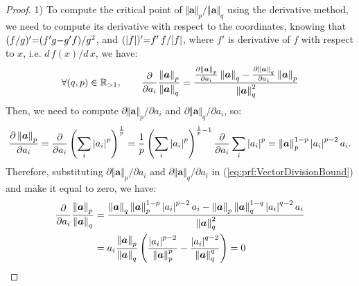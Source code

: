 \begin{proof}

1) To compute the critical point of $\Vert \boldsymbol{a} \Vert_{p} / \Vert \boldsymbol{a} \Vert_{q}$ using the derivative method, we need to compute its derivative with respect to the coordinates, knowing that $(f/g)' {=} (f'g {-} g'f)/g^2$, and $(|f|)' {=} f' \, f / |f| $, where $f'$ is derivative of $f$ with respect to $x$, i.e. $d \, f(x) / d \, x$, we have:
\begin{gather}
\label{eq:prf:VectorDivisionBound} 
\forall (q,p) \in \mathbb{R}_{> 1}, \qquad
\frac{\partial}{\partial a_i} \frac{\left\lVert\boldsymbol{a}\right\rVert_p}{\left\lVert\boldsymbol{a}\right\rVert_q} =
\frac{\frac{\partial \left\lVert\boldsymbol{a}\right\rVert_p}{\partial a_i} \left\lVert\boldsymbol{a}\right\rVert_q - \frac{\partial \left\lVert\boldsymbol{a}\right\rVert_q}{\partial a_i} \left\lVert\boldsymbol{a}\right\rVert_p}{\left\lVert\boldsymbol{a}\right\rVert_q^2}
\end{gather}
Then, we need to compute $\partial \Vert \boldsymbol{a} \Vert_p / \partial a_i$ and $\partial \Vert \boldsymbol{a} \Vert_q / \partial a_i$, so:
\begin{gather*}
\frac{\partial \left\lVert\boldsymbol{a}\right\rVert_p}{\partial a_i} =
\frac{\partial}{\partial a_i} \left( \sum_i \left\lvert a_i\right\rvert^p \right)^\frac{1}{p} = 
\frac{1}{p} \left( \sum_i \left\lvert a_i\right\rvert^p \right)^{\frac{1}{p} - 1} \frac{\partial}{\partial a_i} \sum_i \left\lvert a_i\right\rvert^p =
\left\lVert\boldsymbol{a}\right\rVert_{p} ^ {1 - p} \left\lvert a_i\right\rvert ^{p - 2} a_i.
\end{gather*}
Therefore, substituting $\partial \Vert \boldsymbol{a} \Vert_p / \partial a_i$ and $\partial \Vert \boldsymbol{a} \Vert_q / \partial a_i$ in (\ref{eq:prf:VectorDivisionBound}) and make it equal to zero, we have:
\begin{gather*}
\begin{aligned}
\frac{\partial}{\partial a_i} \frac{\mynorm{\boldsymbol{a}}_p}{\mynorm{\boldsymbol{a}}_q} &=
\mycolor{\frac{\mynorm{\boldsymbol{a}}_q \mynorm{\boldsymbol{a}}_p ^ {1 - p} \myabs{a_i} ^{p - 2} a_i
- \mynorm{\boldsymbol{a}}_p \mynorm{\boldsymbol{a}}_q ^ {1 - q} \myabs{a_i} ^{q - 2} a_i}{\mynorm{\boldsymbol{a}}_q^2}} \\
&= a_i \frac{\mynorm{\boldsymbol{a}}_p}{\mynorm{\boldsymbol{a}}_q} \myparanthese{\frac{\myabs{a_i}^{p-2}}{\mynorm{\boldsymbol{a}}_p^p} - \frac{\myabs{a_i}^{q-2}}{\mynorm{\boldsymbol{a}}_q^q}} = 0

\end{aligned}
\end{gather*}
\end{proof}
